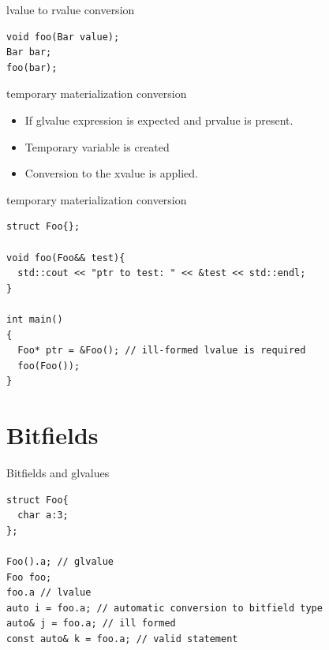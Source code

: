 \documentclass[10pt]{beamer}
\begin{document}
\begin{frame}[fragile]{lvalue to rvalue conversion}
	\begin{verbatim}
void foo(Bar value);
Bar bar;
foo(bar);
	\end{verbatim}
\end{frame}

\begin{frame}{temporary materialization conversion}
	\centering
	\begin{itemize}
		\item If glvalue expression is expected and prvalue is present.
		\item Temporary variable is created
		\item Conversion to the xvalue is applied.
	\end{itemize}
\end{frame}

\begin{frame}[fragile]{temporary materialization conversion}
	\begin{verbatim}
struct Foo{};	
	
void foo(Foo&& test){
  std::cout << "ptr to test: " << &test << std::endl;
}

int main()
{
  Foo* ptr = &Foo(); // ill-formed lvalue is required
  foo(Foo());
}
	\end{verbatim}
\end{frame}

\section{Bitfields}

\begin{frame}[fragile]{Bitfields and glvalues}
	\begin{verbatim}
struct Foo{
  char a:3;
};

Foo().a; // glvalue 
Foo foo;
foo.a // lvalue
auto i = foo.a; // automatic conversion to bitfield type
auto& j = foo.a; // ill formed
const auto& k = foo.a; // valid statement

	\end{verbatim}
\end{frame}

\end{document}
